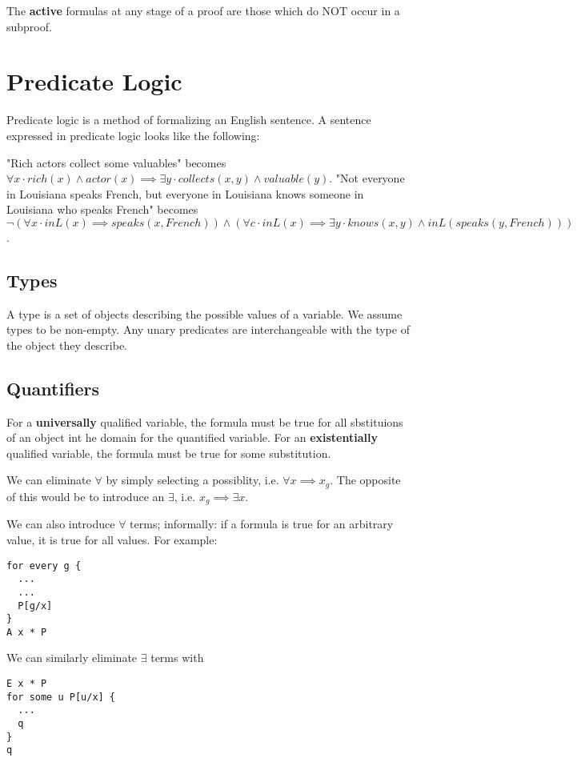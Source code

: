 \documentclass[12pt]{article}
\begin{document}
The {\bf active} formulas at any stage of a proof are those which do NOT occur in a subproof.



\section*{Predicate Logic}
Predicate logic is a method of formalizing an English sentence. A sentence expressed in predicate logic looks like the following:

"Rich actors collect some valuables" becomes $\forall x \cdot rich(x) \land actor(x) \implies \exists y \cdot collects(x,y) \land valuable(y)$. "Not everyone in Louisiana speaks French, but everyone in Louisiana knows someone in Louisiana who speaks French" becomes $\neg (\forall x \cdot inL(x) \implies speaks(x, French)) \land (\forall c \cdot inL(x) \implies \exists y \cdot knows(x,y) \land inL(speaks(y, French)))$.

\subsection*{Types}
A type is a set of objects describing the possible values of a variable. We assume types to be non-empty. Any unary predicates are interchangeable with the type of the object they describe.

\subsection*{Quantifiers}
For a {\bf universally} qualified variable, the formula must be true for all sbstituions of an object int he domain for the quantified variable. For an {\bf existentially} qualified variable, the formula must be true for some substitution.

We can eliminate $\forall$ by simply selecting a possiblity, i.e. $\forall x \implies x_g$. The opposite of this would be to introduce an $\exists$, i.e. $x_g \implies \exists x$.

We can also introduce $\forall$ terms; informally: if a formula is true for an arbitrary value, it is true for all values. For example:
\begin{verbatim}
for every g {
  ...
  ...
  P[g/x]
}
A x * P
\end{verbatim}

We can similarly eliminate $\exists$ terms with
\begin{verbatim}
E x * P
for some u P[u/x] {
  ...
  q
}
q
\end{verbatim}
\end{document}
